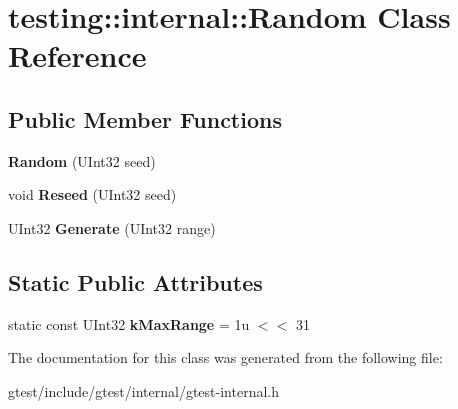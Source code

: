 \hypertarget{classtesting_1_1internal_1_1Random}{}\section{testing\+:\+:internal\+:\+:Random Class Reference}
\label{classtesting_1_1internal_1_1Random}
\subsection*{Public Member Functions}
\begin{DoxyCompactItemize}
\item 
\mbox{\label{classtesting_1_1internal_1_1Random_a6e112be5e7cce00551f6383025f69460}} 
{\bfseries Random} (U\+Int32 seed)
\item 
\mbox{\label{classtesting_1_1internal_1_1Random_adf2f24199318a46f885c78f50d89a69e}} 
void {\bfseries Reseed} (U\+Int32 seed)
\item 
\mbox{\label{classtesting_1_1internal_1_1Random_a9315b7fb621cbcfdf92ed4b5e584c0db}} 
U\+Int32 {\bfseries Generate} (U\+Int32 range)
\end{DoxyCompactItemize}
\subsection*{Static Public Attributes}
\begin{DoxyCompactItemize}
\item 
\mbox{\label{classtesting_1_1internal_1_1Random_a36d72dd7063d0b5338f229e75382fdd2}} 
static const U\+Int32 {\bfseries k\+Max\+Range} = 1u $<$$<$ 31
\end{DoxyCompactItemize}


The documentation for this class was generated from the following file\+:\begin{DoxyCompactItemize}
\item 
gtest/include/gtest/internal/gtest-\/internal.\+h\end{DoxyCompactItemize}
